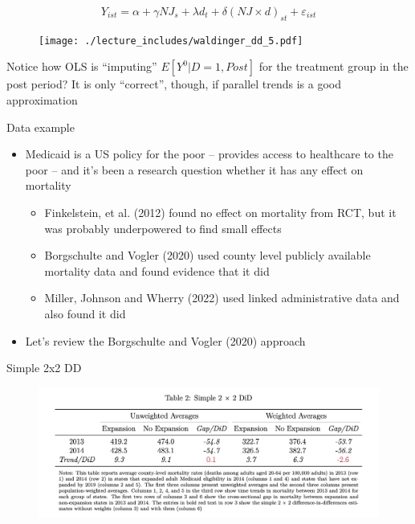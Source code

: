 \documentclass{beamer}
\begin{document}
\begin{frame}[plain]
	$$Y_{ist} = \alpha + \gamma NJ_s + \lambda d_t + \delta(NJ\times d)_{st} + \varepsilon_{ist}$$
	\begin{figure}
	\texttt{[image: ./lecture\_includes/waldinger\_dd\_5.pdf]}
	\end{figure}

Notice how OLS is ``imputing'' $E[Y^0|D=1,Post]$ for the treatment group in the post period? It is only ``correct'', though, if parallel trends is a good approximation

\end{frame}


\begin{frame}{Data example}

\begin{itemize}
\item Medicaid is a US policy for the poor -- provides access to healthcare to the poor -- and it's been a research question whether it has any effect on mortality
	\begin{itemize}
	\item Finkelstein, et al. (2012) found no effect on mortality from RCT, but it was probably underpowered to find small effects
	\item Borgschulte and Vogler (2020) used county level publicly available mortality data and found evidence that it did
	\item Miller, Johnson and Wherry (2022) used linked administrative data and also found it did
	\end{itemize}
\item Let's review the Borgschulte and Vogler (2020) approach

\end{itemize}

\end{frame}

\begin{frame}{Simple 2x2 DD}

\begin{figure}
    \centering
    \includegraphics[height=0.5\textheight]{./lecture_includes/simple2x2.png}
\end{figure}


\end{frame}
\end{document}
